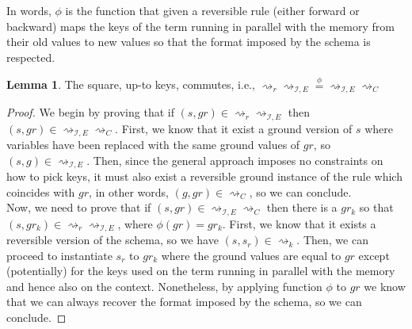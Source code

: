 \documentclass{article}[12pt,a4paper]
\theoremstyle{definition}
\newtheorem{lemma}{Lemma}
\begin{document}
In words, $\phi$ is the function that given a reversible rule (either forward or
backward) maps the keys of the term running in parallel with the memory from
their old values to new values so that the format imposed by the schema is respected.

\begin{lemma}
  The square, up-to keys, commutes, i.e., $\rightsquigarrow_r
  \rightsquigarrow_{\mathcal{I},E} \stackrel{\phi}{=} \rightsquigarrow_{\mathcal{I},E}
  \rightsquigarrow_C $
\end{lemma}
\begin{proof}
  We begin by proving that if $(s, gr) \in \rightsquigarrow_r
  \rightsquigarrow_{\mathcal{I},E} $ then $(s,gr) \in \rightsquigarrow_{\mathcal{I},E}
  \rightsquigarrow_C $. First, we know that it exist a ground version of $s$
  where variables have been replaced with the same ground values of $gr$, so
  $(s, g)\in \rightsquigarrow_{\mathcal{I},E}$. Then, since the general approach
  imposes no constraints on how to pick keys, it must also exist a reversible
  ground instance of the rule which coincides with $gr$, in other words, $(g,
  gr)\in \rightsquigarrow_C$, so we can conclude.\\

  Now, we need to prove that if $(s, gr) \in \rightsquigarrow_{\mathcal{I},E}
  \rightsquigarrow_C $ then there is a $gr_k$ so that $(s,gr_k) \in \rightsquigarrow_r
  \rightsquigarrow_{\mathcal{I},E}$, where $\phi(gr)=gr_k$. First, we know that it exists a reversible
  version of the schema, so we have $(s, s_r)\in \rightsquigarrow_k$. Then, we
  can proceed to instantiate $s_r$ to $gr_k$ where the ground values are equal
  to $gr$ except (potentially) for the keys used on the term running in parallel
  with the memory and hence also on the context. Nonetheless, by applying function $\phi$ to $gr$ we know that we can
  always recover the format imposed by the schema, so we can conclude.

\end{proof}
\end{document}
